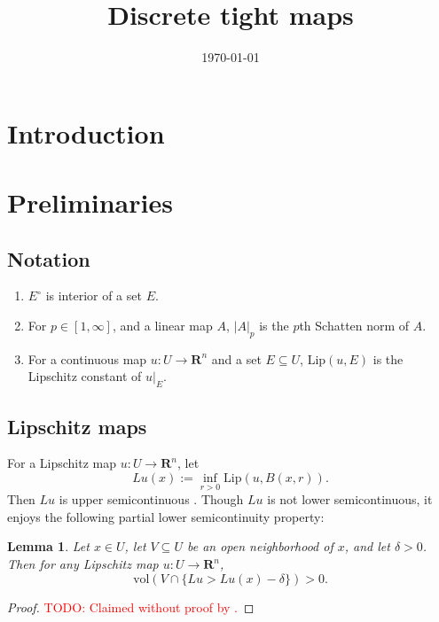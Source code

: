 \documentclass[reqno,11pt]{amsart}
\title{Discrete tight maps}
\author{}
\date{\today}
\newcommand{\RR}{\mathbf{R}}
\newcommand{\vol}{\mathrm{vol}}
\newcommand{\Lip}{\mathrm{Lip}}
\newtheorem{lemma}[theorem]{Lemma}
\theoremstyle{definition}
\numberwithin{equation}{section}
\newcommand\todo[1]{\textcolor{red}{TODO: #1}}
\begin{document}
\begin{abstract}
    
\end{abstract}

\maketitle

\section{Introduction}


\section{Preliminaries}
\subsection{Notation}
\begin{enumerate}
\item $E^\circ$ is interior of a set $E$.
\item For $p \in [1, \infty]$, and a linear map $A$, $|A|_p$ is the $p$th Schatten norm of $A$.
\item For a continuous map $u: U \to \RR^n$ and a set $E \subseteq U$, $\Lip(u, E)$ is the Lipschitz constant of $u|_E$.
\end{enumerate}

\subsection{Lipschitz maps}
For a Lipschitz map $u: U \to \RR^n$, let
$$Lu(x) := \inf_{r > 0} \Lip(u, B(x, r)).$$
Then $Lu$ is upper semicontinuous \cite[Lemma 4.2(a)]{Crandall2008}.
Though $Lu$ is not lower semicontinuous, it enjoys the following partial lower semicontinuity property:

\begin{lemma}
Let $x \in U$, let $V \subseteq U$ be an open neighborhood of $x$, and let $\delta > 0$.
Then for any Lipschitz map $u: U \to \RR^n$,
\begin{equation}\label{partial lower semicontinuity}
\vol(V \cap \{Lu > Lu(x) - \delta\}) > 0.
\end{equation}
\end{lemma}
\begin{proof}
\todo{Claimed without proof by \cite[\S1.4]{Sheffield12}.}
\end{proof}
\end{document}
